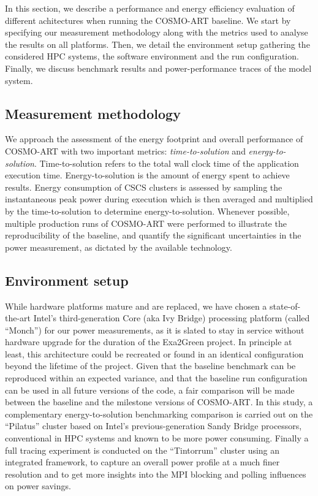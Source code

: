 In  this section,  we  describe a  performance  and energy  efficiency
evaluation  of  different  achitectures  when  running  the  COSMO-ART
baseline.  We  start by  specifying our measurement  methodology along
with the metrics used to  analyse the results on all platforms.  Then,
we detail the environment  setup gathering the considered HPC systems,
the  software  environment and  the  run  configuration.  Finally,  we
discuss benchmark  results and  power-performance traces of  the model
system.

\subsection{Measurement methodology}
\label{subsec:4.1}
We  approach  the  assessment  of  the energy  footprint  and  overall
performance    of    COSMO-ART    with    two    important    metrics:
\textit{time-to-solution}       and       \textit{energy-to-solution}.
Time-to-solution  refers   to  the  total  wall  clock   time  of  the
application execution time. Energy-to-solution is the amount of energy
spent  to achieve  results.  Energy  consumption of  CSCS  clusters is
assessed  by sampling  the instantaneous  peak power  during execution
which  is then  averaged  and multiplied  by  the time-to-solution  to
determine energy-to-solution.   Whenever possible, multiple production
runs of COSMO-ART were  performed to illustrate the reproducibility of
the baseline, and quantify  the significant uncertainties in the power
measurement, as dictated by the available technology.

\subsection{Environment setup}
\label{subsec:4.2}
While hardware  platforms mature  and are replaced,  we have  chosen a
state-of-the-art  Intel's  third-generation   Core  (aka  Ivy  Bridge)
processing platform (called ``Monch'')  for our power measurements, as
it  is slated  to stay  in service  without hardware  upgrade  for the
duration  of  the Exa2Green  project.   In  principle  at least,  this
architecture could be recreated or found in an identical configuration
beyond the lifetime of the project.  Given that the baseline benchmark
can be reproduced  within an expected variance, and  that the baseline
run configuration  can be used in  all future versions of  the code, a
fair comparison  will be made  between the baseline and  the milestone
versions   of    COSMO-ART.    In   this    study,   a   complementary
energy-to-solution  benchmarking  comparison  is  carried out  on  the
``Pilatus'' cluster based  on Intel's previous-generation Sandy Bridge
processors, conventional  in HPC  systems and known  to be  more power
consuming.   Finally a  full tracing  experiment is  conducted  on the
``Tintorrum''  cluster using  an integrated  framework, to  capture an
overall  power profile  at a  much finer  resolution and  to  get more
insights  into  the  MPI  blocking  and polling  influences  on  power
savings.

